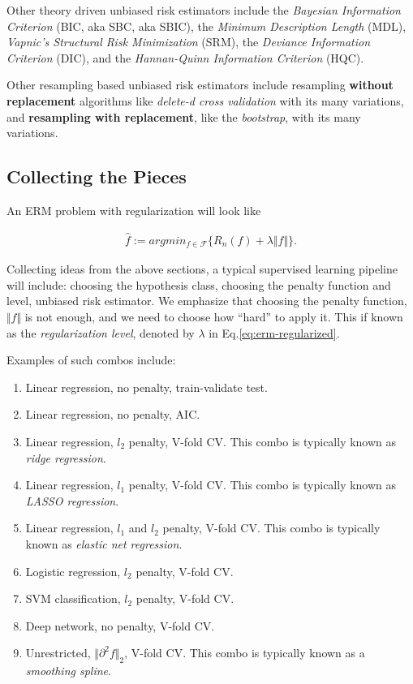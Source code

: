 \documentclass[]{book}
\providecommand{\tightlist}{%
  \setlength{\itemsep}{0pt}\setlength{\parskip}{0pt}}
\theoremstyle{definition}
\theoremstyle{definition}
\theoremstyle{definition}
\theoremstyle{remark}
\begin{document}
Other theory driven unbiased risk estimators include the \emph{Bayesian
Information Criterion} (BIC, aka SBC, aka SBIC), the \emph{Minimum
Description Length} (MDL), \emph{Vapnic's Structural Risk Minimization}
(SRM), the \emph{Deviance Information Criterion} (DIC), and the
\emph{Hannan-Quinn Information Criterion} (HQC).

Other resampling based unbiased risk estimators include resampling
\textbf{without replacement} algorithms like \emph{delete-d cross
validation} with its many variations, and \textbf{resampling with
replacement}, like the \emph{bootstrap}, with its many variations.

\subsection{Collecting the Pieces}\label{collecting-the-pieces}

An ERM problem with regularization will look like

\begin{align}
  \hat f := argmin_{f \in \mathcal{F}} \{ R_n(f)  + \lambda \Vert f \Vert \}.
  \label{eq:erm-regularized}  
\end{align}

Collecting ideas from the above sections, a typical supervised learning
pipeline will include: choosing the hypothesis class, choosing the
penalty function and level, unbiased risk estimator. We emphasize that
choosing the penalty function, \(\Vert f \Vert\) is not enough, and we
need to choose how ``hard'' to apply it. This if known as the
\emph{regularization level}, denoted by \(\lambda\) in
Eq.\eqref{eq:erm-regularized}.

Examples of such combos include:

\begin{enumerate}
\def\labelenumi{\arabic{enumi}.}
\tightlist
\item
  Linear regression, no penalty, train-validate test.
\item
  Linear regression, no penalty, AIC.
\item
  Linear regression, \(l_2\) penalty, V-fold CV. This combo is typically
  known as \emph{ridge regression}.
\item
  Linear regression, \(l_1\) penalty, V-fold CV. This combo is typically
  known as \emph{LASSO regression}.
\item
  Linear regression, \(l_1\) and \(l_2\) penalty, V-fold CV. This combo
  is typically known as \emph{elastic net regression}.
\item
  Logistic regression, \(l_2\) penalty, V-fold CV.
\item
  SVM classification, \(l_2\) penalty, V-fold CV.
\item
  Deep network, no penalty, V-fold CV.
\item
  Unrestricted, \(\Vert \partial^2 f \Vert_2\), V-fold CV. This combo is
  typically known as a \emph{smoothing spline}.
\end{enumerate}
\end{document}
